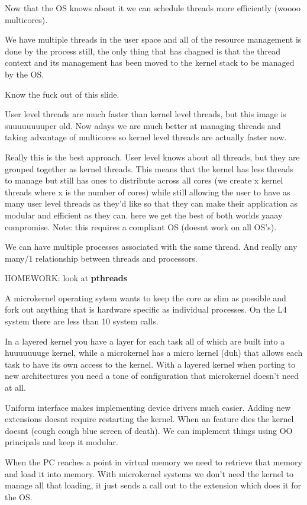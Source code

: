 \documentclass[12pt]{article}
\begin{document}

Now that the OS knows about it we can schedule threads more efficiently (woooo multicores).

We have multiple threads in the user space and all of the resource management is done by the process still, the only thing that has chagned is that the thread context and its management has been moved to the kernel stack to be managed by the OS.

Know the fuck out of this slide.

User level threads are much faster than kernel level threads, but this image is suuuuuuuuper old. Now adays we are much better at managing threads and taking advantage of multicores so kernel level threads are actually faster now.

Really this is the best approach. User level knows about all threads, but they are grouped together as kernel threads. This means that the kernel has less threads to manage but still has ones to distribute across all cores (we create x kernel threads where x is the number of cores) while still allowing the user to have as many user level threads as they'd like so that they can make their application as modular and efficient as they can. here we get the best of both worlds yaaay compromise. Note: this requires a compliant OS (doesnt work on all OS's).

We can have multiple processes associated with the same thread. And really any many/1 relationship between threads and processors.

HOMEWORK: look at \textbf{pthreads}

A microkernel operating sytem wants to keep the core as slim as possible and fork out anything that is hardware specific as individual processes.
On the L4 system there are less than 10 system calls.

In a layered kernel you have a layer for each task all of which are built into a huuuuuuuge kernel, while a microkernel has a micro kernel (duh) that allows each task to have its own access to the kernel. With a layered kernel when porting to new architectures you need a tone of configuration that microkernel doesn't need at all.



Uniform interface makes implementing device drivers much easier. Adding new extensions doesnt require restarting the kernel. When an feature dies the kernel doesnt (cough cough blue screen of death). We can implement things using OO principals and keep it modular.

When the PC reaches a point in virtual memory we need to retrieve that memory and load it into memory. With microkernel systems we don't need the kernel to manage all that loading, it just sends a call out to the extension which does it for the OS.

















\end{document}
